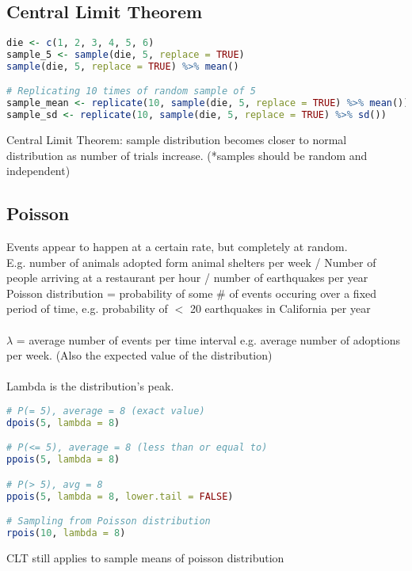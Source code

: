 \documentclass[11pt]{article}
\begin{document}
\subsection{Central Limit Theorem}

\begin{lstlisting}[language=R]
die <- c(1, 2, 3, 4, 5, 6)
sample_5 <- sample(die, 5, replace = TRUE)
sample(die, 5, replace = TRUE) %>% mean()

# Replicating 10 times of random sample of 5
sample_mean <- replicate(10, sample(die, 5, replace = TRUE) %>% mean())
sample_sd <- replicate(10, sample(die, 5, replace = TRUE) %>% sd())
\end{lstlisting}
Central Limit Theorem: sample distribution becomes closer to normal distribution as number of trials increase. (*samples should be random and independent)

\subsection{Poisson}
Events appear to happen at a certain rate, but completely at random.\\
E.g. number of animals adopted form animal shelters per week / Number of people arriving at a restaurant per hour / number of earthquakes per year \\
Poisson distribution = probability of some \# of events occuring over a fixed period of time, e.g. probability of $<$ 20 earthquakes in California per year \\ \;
 \\ 
$\lambda$ = average number of events per time interval e.g. average number of adoptions per week. (Also the expected value of the distribution) \\ \; \\

Lambda is the distribution's peak.

\begin{lstlisting}[language=R]
# P(= 5), average = 8 (exact value)
dpois(5, lambda = 8) 

# P(<= 5), average = 8 (less than or equal to)
ppois(5, lambda = 8)

# P(> 5), avg = 8
ppois(5, lambda = 8, lower.tail = FALSE)

# Sampling from Poisson distribution
rpois(10, lambda = 8)
\end{lstlisting}

CLT still applies to sample means of poisson distribution
\end{document}
